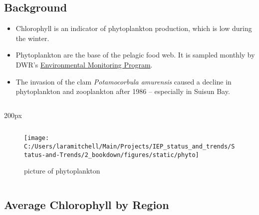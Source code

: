 \documentclass[
]{book}
\providecommand{\tightlist}{%
  \setlength{\itemsep}{0pt}\setlength{\parskip}{0pt}}
\begin{document}
\begin{columns-nocenter}

\begin{column}{0.7\textwidth}
\begin{column}

\hypertarget{background-2}{%
\subsection{Background}\label{background-2}}

\begin{itemize}
\tightlist
\item
  Chlorophyll is an indicator of phytoplankton production, which is low during the winter.
\item
  Phytoplankton are the base of the pelagic food web. It is sampled monthly by DWR's \href{https://emp.baydeltalive.com/wiki/12297}{Environmental Monitoring Program}.
\item
  The invasion of the clam \emph{Potamocorbula amurensis} caused a decline in phytoplankton and zooplankton after 1986 -- especially in Suisun Bay.
\end{itemize}

\end{column}
\end{column}

\begin{column}{200px\textwidth}
\begin{column}

\begin{figure}

{\centering \texttt{[image: C:/Users/laramitchell/Main/Projects/IEP\_status\_and\_trends/Status-and-Trends/2\_bookdown/figures/static/phyto]} 

}

\caption{picture of phytoplankton}\label{fig:unnamed-chunk-156}
\end{figure}

\end{column}
\end{column}

\end{columns-nocenter}

\hypertarget{average-chlorophyll-by-region}{%
\subsection{Average Chlorophyll by Region}\label{average-chlorophyll-by-region}}
\end{document}

